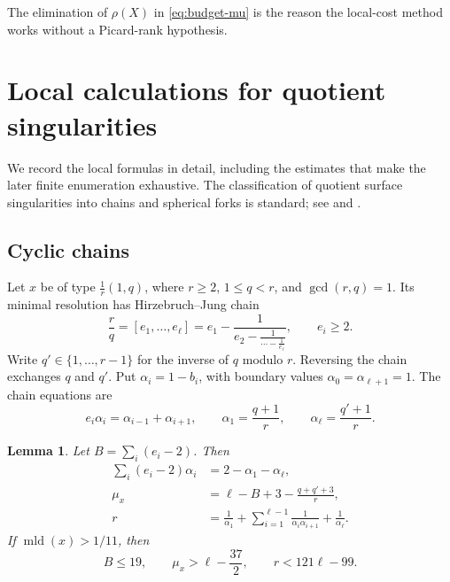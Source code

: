 \documentclass[12pt,a4paper]{article}
\numberwithin{equation}{section}
\newtheorem{lemma}[theorem]{Lemma}
\theoremstyle{definition}
\newcommand{\mld}{\operatorname{mld}}
\begin{document}
The elimination of \(\rho(X)\) in \eqref{eq:budget-mu} is the reason
the local-cost method works without a Picard-rank hypothesis.

\section{Local calculations for quotient singularities}\label{sec:local}

We record the local formulas in detail, including the estimates that
make the later finite enumeration exhaustive. The classification of
quotient surface singularities into chains and spherical forks is
standard; see \cite[Theorem 4.7]{KM98} and
\cite[Definition 2.9 and Lemma 2.10]{LL26stable}.

\subsection{Cyclic chains}

Let \(x\) be of type \(\frac1r(1,q)\), where
\(r\geq2\), \(1\leq q<r\), and \(\gcd(r,q)=1\).
Its minimal resolution has Hirzebruch--Jung chain
\[
 \frac rq=[e_1,\ldots,e_\ell]
       =e_1-\frac1{e_2-\frac1{\cdots-\frac1{e_\ell}}},
                   \qquad e_i\geq2.
\]
Write \(q'\in\{1,\ldots,r-1\}\) for the inverse of \(q\) modulo \(r\).
Reversing the chain exchanges \(q\) and \(q'\).
Put \(\alpha_i=1-b_i\), with boundary values
\(\alpha_0=\alpha_{\ell+1}=1\). The chain equations are
\begin{equation}\label{eq:chain-recurrence}
 e_i\alpha_i=\alpha_{i-1}+\alpha_{i+1},\qquad
 \alpha_1=\frac{q+1}{r},\qquad
 \alpha_\ell=\frac{q'+1}{r}.
\end{equation}

\begin{lemma}\label{lem:cyclic-identities}
Let \(B=\sum_i(e_i-2)\). Then
\begin{align}
 \sum_i(e_i-2)\alpha_i&=2-\alpha_1-\alpha_\ell,\label{eq:chain-sum}\\
 \mu_x&=\ell-B+3-\frac{q+q'+3}{r},\label{eq:mu-cyclic}\\
 r&=\frac1{\alpha_1}
       +\sum_{i=1}^{\ell-1}\frac1{\alpha_i\alpha_{i+1}}
       +\frac1{\alpha_\ell}.\label{eq:det-identity}
\end{align}
If \(\mld(x)>1/11\), then
\begin{equation}\label{eq:cyclic-rough}
               B\leq19,\qquad
               \mu_x>\ell-\frac{37}{2},\qquad
               r<121\ell-99.
\end{equation}
\end{lemma}
\end{document}
